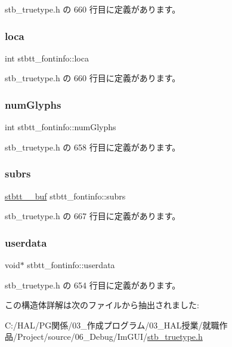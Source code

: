  stb\+\_\+truetype.\+h の 660 行目に定義があります。

\mbox{\label{structstbtt__fontinfo_a15344195b181b50bde4f59ae7ca248c0}} 
\subsubsection{\texorpdfstring{loca}{loca}}
{\footnotesize\ttfamily int stbtt\+\_\+fontinfo\+::loca}



 stb\+\_\+truetype.\+h の 660 行目に定義があります。

\mbox{\label{structstbtt__fontinfo_a60ad8301a98eb7cd91472ce846d9080d}} 
\subsubsection{\texorpdfstring{num\+Glyphs}{numGlyphs}}
{\footnotesize\ttfamily int stbtt\+\_\+fontinfo\+::num\+Glyphs}



 stb\+\_\+truetype.\+h の 658 行目に定義があります。

\mbox{\label{structstbtt__fontinfo_aebc496bb1c001a8a90e0e66da16107d2}} 
\subsubsection{\texorpdfstring{subrs}{subrs}}
{\footnotesize\ttfamily \mbox{\hyperlink{structstbtt____buf}{stbtt\+\_\+\+\_\+buf}} stbtt\+\_\+fontinfo\+::subrs}



 stb\+\_\+truetype.\+h の 667 行目に定義があります。

\mbox{\label{structstbtt__fontinfo_a9c81078df96a7a3f730137151efab285}} 
\subsubsection{\texorpdfstring{userdata}{userdata}}
{\footnotesize\ttfamily void$\ast$ stbtt\+\_\+fontinfo\+::userdata}



 stb\+\_\+truetype.\+h の 654 行目に定義があります。



この構造体詳解は次のファイルから抽出されました\+:\begin{DoxyCompactItemize}
\item 
C\+:/\+H\+A\+L/\+P\+G関係/03\+\_\+作成プログラム/03\+\_\+\+H\+A\+L授業/就職作品/\+Project/source/06\+\_\+\+Debug/\+Im\+G\+U\+I/\mbox{\hyperlink{stb__truetype_8h}{stb\+\_\+truetype.\+h}}\end{DoxyCompactItemize}
